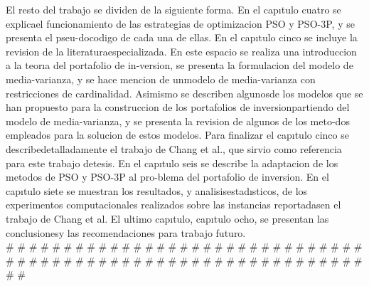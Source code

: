 El  resto  del  trabajo  se  dividen  de  la  siguiente  forma.  En  el  capıtulo  cuatro  se  explicael funcionamiento de las estrategias de optimizacion PSO y PSO-3P, y se presenta el pseu-docodigo  de  cada  una  de  ellas.  En  el  capıtulo  cinco  se  incluye  la  revision  de  la  literaturaespecializada.  En  este  espacio  se  realiza  una  introduccion  a  la  teorıa  del  portafolio  de  in-version, se presenta la formulacion del modelo de media-varianza, y se hace mencion de unmodelo de media-varianza con restricciones de cardinalidad. Asimismo se describen algunosde  los  modelos  que  se  han  propuesto  para  la  construccion  de  los  portafolios  de  inversionpartiendo del modelo de media-varianza, y se presenta la revision de algunos de los meto-dos empleados para la solucion de estos modelos. Para finalizar el capıtulo cinco se describedetalladamente el trabajo de Chang et al., que sirvio como referencia para este trabajo detesis. En el capıtulo seis se describe la adaptacion de los metodos de PSO y PSO-3P al pro-blema del portafolio de inversion. En el capıtulo siete se muestran los resultados, y analisisestadısticos, de los experimentos computacionales realizados sobre las instancias reportadasen el trabajo de Chang et al. El ultimo capıtulo, capıtulo ocho, se presentan las conclusionesy las recomendaciones para trabajo futuro.\\
\# \# \# \# \# \# \# \# \# \# \# \# \# \# \# \# \# \# \# \# \# \# \# \# \# \# \# \# \# \# \# \# \# \# \# \# \# \# \# \# \# \# \# \# \# \# \# \# \# \# \# \# \# \# \# \# \# \# \# \# \# \# \# \#\\\\
